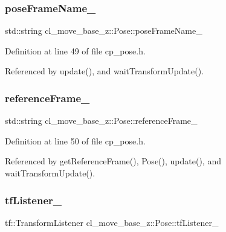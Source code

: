 \subsubsection{\texorpdfstring{pose\+Frame\+Name\+\_\+}{poseFrameName\_}}
{\footnotesize\ttfamily std\+::string cl\+\_\+move\+\_\+base\+\_\+z\+::\+Pose\+::pose\+Frame\+Name\+\_\+\hspace{0.3cm}{\ttfamily [private]}}



Definition at line 49 of file cp\+\_\+pose.\+h.



Referenced by update(), and wait\+Transform\+Update().

\mbox{\label{classcl__move__base__z_1_1Pose_a6a7a593232b6edaf99103d48ad8da9d3}} 
\subsubsection{\texorpdfstring{reference\+Frame\+\_\+}{referenceFrame\_}}
{\footnotesize\ttfamily std\+::string cl\+\_\+move\+\_\+base\+\_\+z\+::\+Pose\+::reference\+Frame\+\_\+\hspace{0.3cm}{\ttfamily [private]}}



Definition at line 50 of file cp\+\_\+pose.\+h.



Referenced by get\+Reference\+Frame(), Pose(), update(), and wait\+Transform\+Update().

\mbox{\label{classcl__move__base__z_1_1Pose_a6d669632db37e0e51734d2a65e8dcd41}} 
\subsubsection{\texorpdfstring{tf\+Listener\+\_\+}{tfListener\_}}
{\footnotesize\ttfamily tf\+::\+Transform\+Listener cl\+\_\+move\+\_\+base\+\_\+z\+::\+Pose\+::tf\+Listener\+\_\+\hspace{0.3cm}{\ttfamily [private]}}



